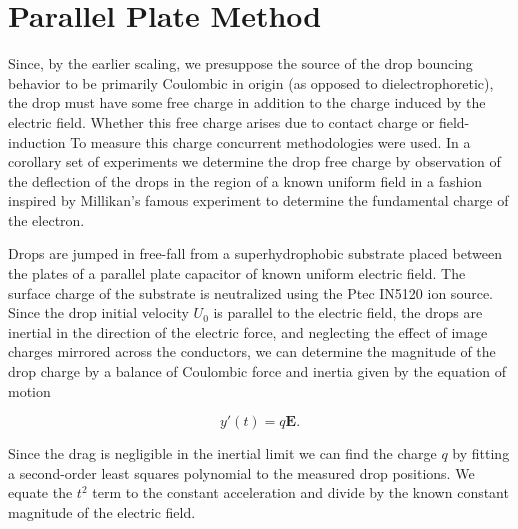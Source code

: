 \documentclass[12pt,a4paper,oneside]{book}
\begin{document}
\appendix
\appendixpage
\noappendicestocpagenum
\addappheadtotoc

\chapter{Parallel Plate Method}
\label{sec.drop_charge}
Since, by the earlier scaling, we presuppose the source of the drop bouncing behavior to be primarily Coulombic in origin (as opposed to dielectrophoretic), the drop must have some free charge in addition to the charge induced by the electric field. Whether this free charge arises due to contact charge or field-induction To measure this charge concurrent methodologies were used. In a corollary set of experiments we determine the drop free charge by observation of the deflection of the drops in the region of a known uniform field in a fashion inspired by Millikan's famous experiment to determine the fundamental charge of the electron.

Drops are jumped in free-fall from a superhydrophobic substrate placed between the plates of a parallel plate capacitor of known uniform electric field. The surface charge of the substrate is neutralized using the Ptec IN5120 ion source. Since the drop initial velocity $U_0$ is parallel to the electric field, the drops are inertial in the direction of the electric force, and neglecting the effect of image charges mirrored across the conductors, we can determine the magnitude of the drop charge by a balance of Coulombic force and inertia given by the equation of motion

\[ y'(t) = q\mathbf{E}. \]

Since the drag is negligible in the inertial limit we can find the charge $q$ by fitting a second-order least squares polynomial to the measured drop positions. We equate the $t^2$ term to the constant acceleration and divide by the known constant magnitude of the electric field.  
\end{document}

